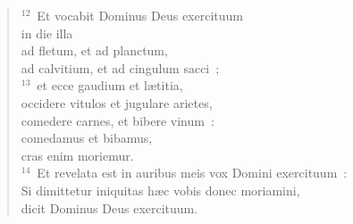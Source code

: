 \begin{verse}
${}^{12}$~Et vocabit Dominus Deus exercituum\\ in die illa\\ ad fletum, et ad planctum,\\ ad calvitium, et ad cingulum sacci~;\\
${}^{13}$~et ecce gaudium et l\ae titia,\\ occidere vitulos et jugulare arietes,\\ comedere carnes, et bibere vinum~:\\ comedamus et bibamus,\\ cras enim moriemur.\\
${}^{14}$~Et revelata est in auribus meis vox Domini exercituum~:\\ Si dimittetur iniquitas h\ae c vobis donec moriamini,\\ dicit Dominus Deus exercituum.\end{verse}


